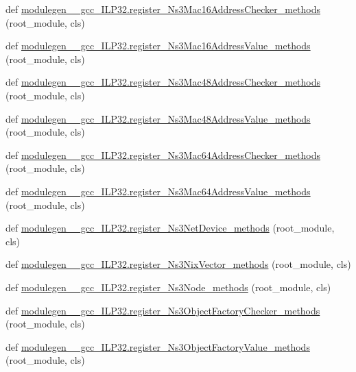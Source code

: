 \begin{DoxyCompactItemize}
def \hyperlink{namespacemodulegen____gcc__ILP32_aaec85a83f8b71e3cab9f3899af0d1a5d}{modulegen\+\_\+\+\_\+gcc\+\_\+\+I\+L\+P32.\+register\+\_\+\+Ns3\+Mac16\+Address\+Checker\+\_\+methods} (root\+\_\+module, cls)
\item 
def \hyperlink{namespacemodulegen____gcc__ILP32_a0ab344fc6c00a7cbee2ca1b5d70498cc}{modulegen\+\_\+\+\_\+gcc\+\_\+\+I\+L\+P32.\+register\+\_\+\+Ns3\+Mac16\+Address\+Value\+\_\+methods} (root\+\_\+module, cls)
\item 
def \hyperlink{namespacemodulegen____gcc__ILP32_a9a21f6afbd8086013a32b274dbadbbfe}{modulegen\+\_\+\+\_\+gcc\+\_\+\+I\+L\+P32.\+register\+\_\+\+Ns3\+Mac48\+Address\+Checker\+\_\+methods} (root\+\_\+module, cls)
\item 
def \hyperlink{namespacemodulegen____gcc__ILP32_acd3d4984a8cfb1ebfef0f6abc746e62c}{modulegen\+\_\+\+\_\+gcc\+\_\+\+I\+L\+P32.\+register\+\_\+\+Ns3\+Mac48\+Address\+Value\+\_\+methods} (root\+\_\+module, cls)
\item 
def \hyperlink{namespacemodulegen____gcc__ILP32_a163e91471391feb959cf5604ad04906e}{modulegen\+\_\+\+\_\+gcc\+\_\+\+I\+L\+P32.\+register\+\_\+\+Ns3\+Mac64\+Address\+Checker\+\_\+methods} (root\+\_\+module, cls)
\item 
def \hyperlink{namespacemodulegen____gcc__ILP32_afa3440f92e5c8f267c3126abc98fc181}{modulegen\+\_\+\+\_\+gcc\+\_\+\+I\+L\+P32.\+register\+\_\+\+Ns3\+Mac64\+Address\+Value\+\_\+methods} (root\+\_\+module, cls)
\item 
def \hyperlink{namespacemodulegen____gcc__ILP32_a88fafb58aa743dae1a3acfbbb6787697}{modulegen\+\_\+\+\_\+gcc\+\_\+\+I\+L\+P32.\+register\+\_\+\+Ns3\+Net\+Device\+\_\+methods} (root\+\_\+module, cls)
\item 
def \hyperlink{namespacemodulegen____gcc__ILP32_a9b2d434ab0f4ea1d861923f9a09be052}{modulegen\+\_\+\+\_\+gcc\+\_\+\+I\+L\+P32.\+register\+\_\+\+Ns3\+Nix\+Vector\+\_\+methods} (root\+\_\+module, cls)
\item 
def \hyperlink{namespacemodulegen____gcc__ILP32_a2500f4dcd70d582b086c6ce23502e83c}{modulegen\+\_\+\+\_\+gcc\+\_\+\+I\+L\+P32.\+register\+\_\+\+Ns3\+Node\+\_\+methods} (root\+\_\+module, cls)
\item 
def \hyperlink{namespacemodulegen____gcc__ILP32_aee073757310c9de4d2861b5c4b4eee5c}{modulegen\+\_\+\+\_\+gcc\+\_\+\+I\+L\+P32.\+register\+\_\+\+Ns3\+Object\+Factory\+Checker\+\_\+methods} (root\+\_\+module, cls)
\item 
def \hyperlink{namespacemodulegen____gcc__ILP32_a7505caf7d909001e889b89ce94143f4a}{modulegen\+\_\+\+\_\+gcc\+\_\+\+I\+L\+P32.\+register\+\_\+\+Ns3\+Object\+Factory\+Value\+\_\+methods} (root\+\_\+module, cls)

\end{DoxyCompactItemize}
